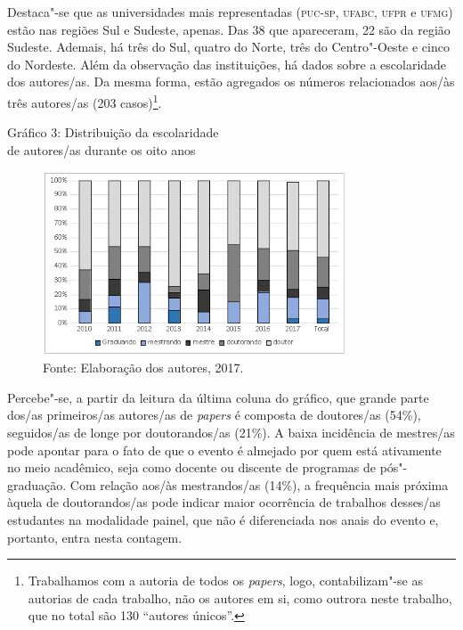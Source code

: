 Destaca"-se que as universidades mais representadas (\textsc{puc}-\textsc{sp}, \textsc{ufabc}, \textsc{ufpr}
e \textsc{ufmg}) estão nas regiões Sul e Sudeste, apenas. Das 38 que apareceram,
22 são da região Sudeste. Ademais, há três do Sul, quatro do Norte, três
do Centro"-Oeste e cinco do Nordeste. Além da observação das
instituições, há dados sobre a escolaridade dos autores/as. Da mesma
forma, estão agregados os números relacionados aos/às três autores/as
(203 casos)\footnote{Trabalhamos com a autoria de todos os
  \emph{papers}, logo, contabilizam"-se as autorias de cada trabalho, não
  os autores em si, como outrora neste trabalho, que no total são 130
  ``autores únicos''.}.

\pagebreak

\begin{center}
Gráfico 3: Distribuição da escolaridade\\ de autores/as durante os oito anos
\end{center}

\begin{figure}[!ht]
\centering
 \includegraphics[width=90mm]{./imgs/graf3_3.png}
\caption{Fonte: Elaboração dos autores, 2017.}
\end{figure}

Percebe"-se, a partir da leitura da última coluna do gráfico, que grande
parte dos/as primeiros/as autores/as de \emph{papers} é composta de
doutores/as (54\%), seguidos/as de longe por doutorandos/as (21\%). A
baixa incidência de mestres/as pode apontar para o fato de que o evento
é almejado por quem está ativamente no meio acadêmico, seja como docente
ou discente de programas de pós"-graduação. Com relação aos/às
mestrandos/as (14\%), a frequência mais próxima àquela de doutorandos/as
pode indicar maior ocorrência de trabalhos desses/as estudantes na
modalidade painel, que não é diferenciada nos anais do evento e,
portanto, entra nesta contagem.

